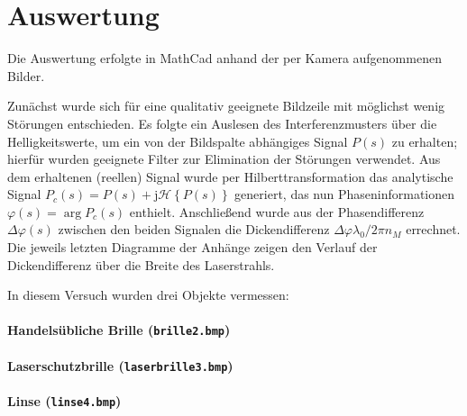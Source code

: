 \section{Auswertung}

Die Auswertung erfolgte in MathCad anhand der per Kamera aufgenommenen Bilder.

Zunächst wurde sich für eine qualitativ geeignete Bildzeile mit möglichst wenig Störungen entschieden. Es folgte ein Auslesen des Interferenzmusters über die Helligkeitswerte, um ein von der Bildspalte abhängiges Signal $P(s)$ zu erhalten; hierfür wurden geeignete Filter zur Elimination der Störungen verwendet. Aus dem erhaltenen (reellen) Signal wurde per Hilberttransformation das analytische Signal $P_c(s) = P(s) + \mathrm j \mathcal H\left\lbrace P(s) \right\rbrace$ generiert, das nun Phaseninformationen $\varphi(s)=\arg P_c(s)$ enthielt. Anschließend wurde aus der Phasendifferenz $\Delta\varphi(s)$  zwischen den beiden Signalen die Dickendifferenz $\Delta\varphi\lambda_0 / 2\pi n_M$ errechnet. Die jeweils letzten Diagramme der Anhänge zeigen den Verlauf der Dickendifferenz über die Breite des Laserstrahls.

In diesem Versuch wurden drei Objekte vermessen:

\paragraph*{Handelsübliche Brille (\texttt{brille2.bmp})}

\paragraph*{Laserschutzbrille (\texttt{laserbrille3.bmp})}

\paragraph*{Linse (\texttt{linse4.bmp})}